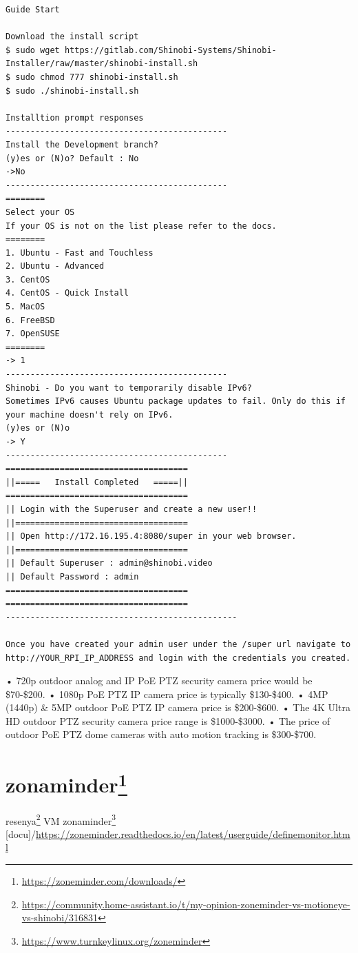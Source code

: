 \documentclass[
  10pt,
]{krantz}
\DeclareRobustCommand{\href}[2]{#2\footnote{\url{#1}}}
\begin{document}
\begin{verbatim}
Guide Start

Download the install script
$ sudo wget https://gitlab.com/Shinobi-Systems/Shinobi-Installer/raw/master/shinobi-install.sh
$ sudo chmod 777 shinobi-install.sh
$ sudo ./shinobi-install.sh

Installtion prompt responses 
---------------------------------------------
Install the Development branch?
(y)es or (N)o? Default : No
->No
---------------------------------------------
========
Select your OS
If your OS is not on the list please refer to the docs.
========
1. Ubuntu - Fast and Touchless
2. Ubuntu - Advanced
3. CentOS
4. CentOS - Quick Install
5. MacOS
6. FreeBSD
7. OpenSUSE
========
-> 1
---------------------------------------------
Shinobi - Do you want to temporarily disable IPv6?
Sometimes IPv6 causes Ubuntu package updates to fail. Only do this if your machine doesn't rely on IPv6.
(y)es or (N)o
-> Y
---------------------------------------------
=====================================
||=====   Install Completed   =====||
=====================================
|| Login with the Superuser and create a new user!!
||===================================
|| Open http://172.16.195.4:8080/super in your web browser.
||===================================
|| Default Superuser : admin@shinobi.video
|| Default Password : admin
=====================================
=====================================
-----------------------------------------------

Once you have created your admin user under the /super url navigate to http://YOUR_RPI_IP_ADDRESS and login with the credentials you created.
\end{verbatim}

• 720p outdoor analog and IP PoE PTZ security camera price would be \$70-\$200. • 1080p PoE PTZ IP camera price is typically \$130-\$400. • 4MP (1440p) \& 5MP outdoor PoE PTZ IP camera price is \$200-\$600. • The 4K Ultra HD outdoor PTZ security camera price range is \$1000-\$3000. • The price of outdoor PoE PTZ dome cameras with auto motion tracking is \$300-\$700.

\hypertarget{zonaminder}{%
\section{\texorpdfstring{\href{https://zoneminder.com/downloads/}{zonaminder}}{zonaminder}}\label{zonaminder}}

\href{https://community.home-assistant.io/t/my-opinion-zoneminder-vs-motioneye-vs-shinobi/316831}{resenya} \href{https://www.turnkeylinux.org/zoneminder}{VM zonaminder} {[}docu{]}/\url{https://zoneminder.readthedocs.io/en/latest/userguide/definemonitor.html}
\end{document}
